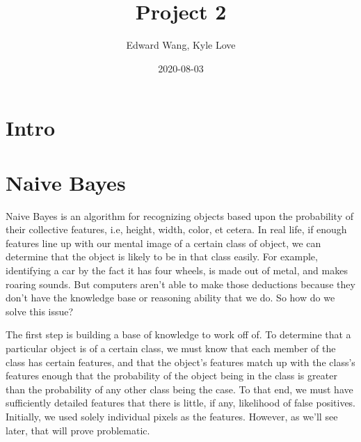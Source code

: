 \documentclass{article}
\title{Project 2}
\date{2020-08-03}
\author{Edward Wang, Kyle Love}
\begin{document}
\maketitle

\section{Intro}

\section{Naive Bayes}
Naive Bayes is an algorithm for recognizing objects based upon the probability of their collective features, i.e, height, width, color, et cetera. In real life, if enough features line up with our mental image of a certain class of object, we can determine that the object is likely to be in that class easily. For example, identifying a car by the fact it has four wheels, is made out of metal, and makes roaring sounds. But computers aren't able to make those deductions because they don't have the knowledge base or reasoning ability that we do. So how do we solve this issue?

The first step is building a base of knowledge to work off of. To determine that a particular object is of a certain class, we must know that each member of the class has certain features, and that the object's features match up with the class's features enough that the probability of the object being in the class is greater than the probability of any other class being the case. To that end, we must have sufficiently detailed features that there is little, if any, likelihood of false positives. Initially, we used solely individual pixels as the features. However, as we'll see later, that will prove problematic.
\end{document}
